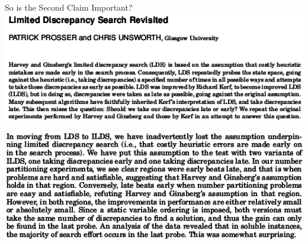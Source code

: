 \documentclass{beamer}
\begin{document}
\begin{frame}{So is the Second Claim Important?}
    \centering\includegraphics*[keepaspectratio=true,scale=0.4]{images/ldsr-paper.png}

    \vspace{2em}

    \centering\includegraphics*[keepaspectratio=true,scale=0.4]{images/ldsr-conclusion.png}

    \vspace{0em}

\end{frame}
\end{document}
